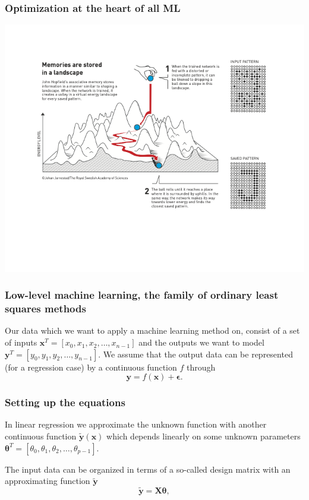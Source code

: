\documentclass{beamer}
\begin{document}
\begin{frame}
\frametitle{Optimization at the heart of all ML}

\vspace{6mm}

\centerline{\includegraphics[width=1.0\linewidth]{figures/optimization.png}}

\vspace{6mm}
\end{frame}

\begin{frame}
\frametitle{Low-level machine learning, the family of ordinary least squares methods}

Our data which we want to apply a machine learning method on, consist
of a set of inputs $\bm{x}^T=[x_0,x_1,x_2,\dots,x_{n-1}]$ and the
outputs we want to model $\bm{y}^T=[y_0,y_1,y_2,\dots,y_{n-1}]$.
We assume  that the output data can be represented (for a regression case) by a continuous function $f$
through
\[
\bm{y}=f(\bm{x})+\bm{\epsilon}.
\]
\end{frame}

\begin{frame}
\frametitle{Setting up the equations}

In linear regression we approximate the unknown function with another
continuous function $\tilde{\bm{y}}(\bm{x})$ which depends linearly on
some unknown parameters
$\bm{\theta}^T=[\theta_0,\theta_1,\theta_2,\dots,\theta_{p-1}]$.

The input data can be organized in terms of a so-called design matrix 
with an approximating function $\bm{\tilde{y}}$ 
\[
\bm{\tilde{y}}= \bm{X}\bm{\theta},
\]
\end{frame}
\end{document}
